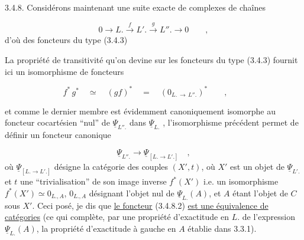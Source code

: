 3.4.8. Considérons maintenant une suite exacte de complexes de chaînes

\begin{equation}\tag{3.4.8.1}
0 \longrightarrow L. \xrightarrow{f} L'. \xrightarrow{g} L''. \longrightarrow 0 \qquad ,
\end{equation}
d'où des foncteurs du type (3.4.3)

\begin{center}
\end{center}
La propriété de transitivité qu'on devine sur les foncteurs du type (3.4.3) fournit ici un isomorphisme de foncteurs

\begin{equation*}
f^* \, g^* \quad \simeq \quad (gf)^* \quad = \quad (0_{L. \,\to\, L''.})^* \qquad , \qquad 
\end{equation*}


 et comme le dernier membre est évidemment canoniquement isomorphe au foncteur cocartésien ``nul'' de $\underline{\Psi}_{L''.}$ dans $\underline{\Psi}_{L.}$ , l'isomorphisme précédent permet de définir un foncteur canonique

\begin{equation}\tag{3.4.8.2}
\underline{\Psi}_{L''.} \longrightarrow \underline{\Psi}_{[L. \longrightarrow L'.]} \quad ,
\end{equation}
où $\underline{\Psi}_{[L. \longrightarrow L'.]}$ désigne la catégorie des couples $(X',t)$, où $X'$ est un objet de $\underline{\Psi}_{L'.}$ et $t$ une ``trivialisation'' de son image inverse $f^*(X')$ i.e. un isomorphisme $f^*(X') \simeq 0_{L.,A}$, $0_{L.,A}$ désignant l'objet nul de $\underline{\Psi}_{L.}(A)$, et $A$ étant l'objet de $C$ sous $X'$. Ceci posé, je dis que \underline{le foncteur} (3.4.8.2) \underline{est une équivalence de catégories} (ce qui complète, par une propriété d'exactitude en $L.$ de l'expression $\underline{\Psi}_{L.}(A)$, la propriété d'exactitude à gauche en $A$ établie dans 3.3.1).

